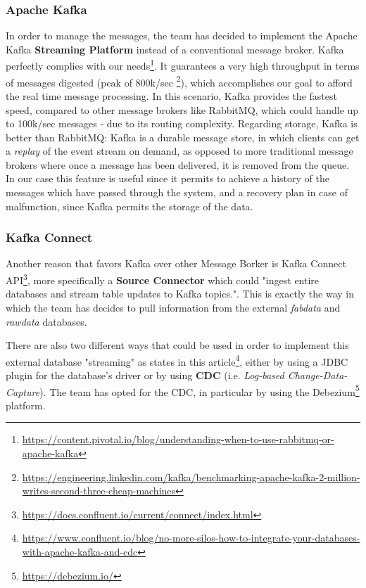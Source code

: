 \subsubsection{Apache Kafka}
In order to manage the messages, the team has decided to implement the Apache Kafka \textbf{Streaming Platform} instead of a conventional message broker.
Kafka perfectly complies with our needs\footnote{\url{https://content.pivotal.io/blog/understanding-when-to-use-rabbitmq-or-apache-kafka}}. It guarantees a very high throughput in terms of messages digested (peak of 800k/sec
\footnote{\url{https://engineering.linkedin.com/kafka/benchmarking-apache-kafka-2-million-writes-second-three-cheap-machines}}), which accomplishes our goal to afford the real time message processing. In this scenario, Kafka provides the fastest speed, compared to other message brokers like RabbitMQ, which could handle up to 100k/sec messages - due to its routing complexity.
Regarding storage, Kafka is better than RabbitMQ: Kafka is a durable message store, in which clients can get a \textit{replay} of the event stream on demand, as opposed to more traditional message brokers where once a message has been delivered, it is removed from the queue.
In our case this feature is useful since it permits to achieve a history of the messages which have passed through the system, and a recovery plan in case of malfunction, since Kafka permits the storage of the data.

\subsubsection{Kafka Connect}
\label{kafka_connect}
Another reason that favors Kafka over other Message Borker is Kafka Connect API\footnote{\url{https://docs.confluent.io/current/connect/index.html}}, more specifically a \textbf{Source Connector} which could "ingest entire databases and stream table updates to Kafka topics.". This is exactly the way in which the team has decides to pull information from the external \textit{fab\textunderscore data} and \textit{raw\textunderscore data} databases.

There are also two different ways that could be used in order to implement this external database "streaming" as states in this article\footnote{\url{https://www.confluent.io/blog/no-more-silos-how-to-integrate-your-databases-with-apache-kafka-and-cdc}}, either by using a JDBC plugin for the database's driver or by using \textbf{CDC} (i.e. \textit{Log-based Change-Data-Capture}). The team has opted for the CDC, in particular by using the Debezium\footnote{\url{https://debezium.io/}} platform.

